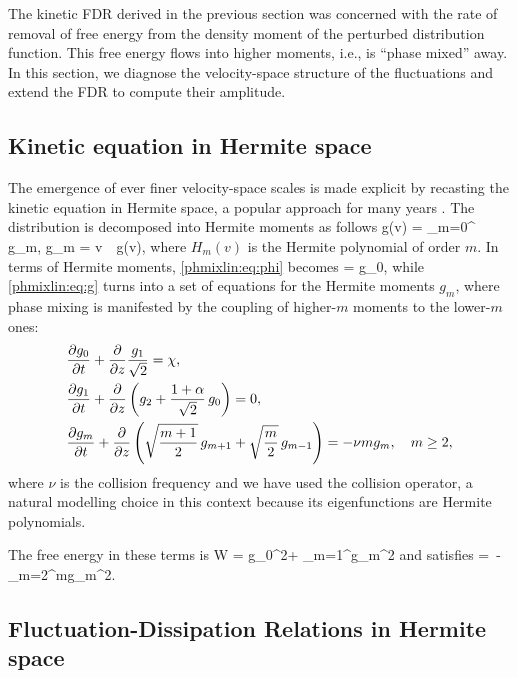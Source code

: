 The kinetic FDR derived in the previous section was concerned 
with the rate of removal of free energy from the density moment 
of the perturbed distribution function. This free energy flows into 
higher moments, i.e., is ``phase mixed'' away. In this section, 
we diagnose the velocity-space structure of the fluctuations
and extend the FDR to compute their amplitude. 

\subsection{Kinetic equation in Hermite space}
\label{phmixlin:sec:KE_Hermite}

The emergence of ever finer velocity-space scales is made explicit
by recasting the kinetic equation  in Hermite space, 
a popular approach for many years 
\cite{armstrong67,grant67a,hammett93,parker95,ng99,watanabe04,zocco11,loureiro13,hatch13,plunk14}. 
The distribution is decomposed into Hermite moments as follows
\beq
g(v) = \sum_{m=0}^\infty {} g_m, \quad
g_m = \int \rmd v\, \, g(v), 
\eeq
where $H_m(v)$ is the Hermite polynomial of order $m$. 
In terms of Hermite moments, \eqref{phmixlin:eq:phi} becomes
\beq
\phi = \alpha g_0,
\label{phmixlin:eq:phi_g0}
\eeq
while \eqref{phmixlin:eq:g} turns into a set of equations for the Hermite moments $g_m$, 
where phase mixing is manifested by the coupling of higher-$m$ moments 
to the lower-$m$ ones: 
\begin{align} 
\label{phmixlin:eq:g0}
&\frac{\partial g_0}{\partial t} + \frac{\partial }{\partial z}\frac{g_1}{\sqrt{2}}  = \chi,\\
\label{phmixlin:eq:g1}
&\frac{\partial g_1}{\partial t} + \frac{\partial }{\partial z}\left(g_2 + \frac{1+\alpha}{\sqrt{2}}\,g_0\right)  = 0,\\
&\frac{\partial g_m}{\partial t} + \frac{\partial }{\partial z}\left(\sqrt{\frac{m+1}{2}}\,g_{m+1} + \sqrt{\frac{m}{2}}\,g_{m-1}\right) 
= -\nu m g_m,  \quad m\ge2,
\label{phmixlin:eq:gmeq}
\end{align}
where $\nu$ is the collision frequency and 
we have used the \cite{lenard58} collision operator, a natural modelling 
choice in this context because its eigenfunctions are Hermite polynomials. 

The free energy  in these terms is 
\beq
W = \la g_0^2\ra + \sum_{m=1}^\infty \la g_m^2\ra 
\eeq
and satisfies
\beq
{} = \,\eps - \nu\sum_{m=2}^\infty m\la g_m^2\ra.
\label{phmixlin:eq:Wbal}
\eeq

\subsection{Fluctuation-Dissipation Relations in Hermite space}
\label{phmixlin:sec:FDR_Hermite}

